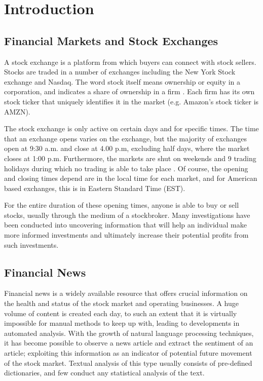 
\chapter{Introduction}
\label{chap:context}
\section{Financial Markets and Stock Exchanges}
A stock exchange is a platform from which buyers can connect with stock sellers. Stocks are traded in a number of exchanges including the New York Stock exchange and Nasdaq. The word stock itself means ownership or equity in a corporation, and indicates a share of ownership in a firm \parencite{stock-market}. Each firm has its own stock ticker that uniquely identifies it in the market (e.g. Amazon's stock ticker is AMZN).

The stock exchange is only active on certain days and for specific times. The time that an exchange opens varies on the exchange, but the majority of exchanges open at 9:30 a.m. and close at 4.00 p.m, excluding half days, where the market closes at 1:00 p.m. Furthermore, the markets are shut on weekends and 9 trading holidays during which no trading is able to take place \parencite{stock-opening-hours}. Of course, the opening and closing times depend are in the local time for each market, and for American based exchanges, this is in Eastern Standard Time (EST).

For the entire duration of these opening times, anyone is able to buy or sell stocks, usually through the medium of a stockbroker. Many investigations have been conducted into uncovering information that will help an individual make more informed investments and ultimately increase their potential profits from such investments.

\section{Financial News}
Financial news is a widely available resource that offers crucial information on the health and status of the stock market and operating businesses. A huge volume of content is created each day, to such an extent that it is virtually impossible for manual methods to keep up with, leading to developments in automated analysis. With the growth of natural language processing techniques, it has become possible to observe a news article and extract the sentiment of an article; exploiting this information as an indicator of potential future movement of the stock market. Textual analysis of this type usually consists of pre-defined dictionaries, and few conduct any statistical analysis of the text.

